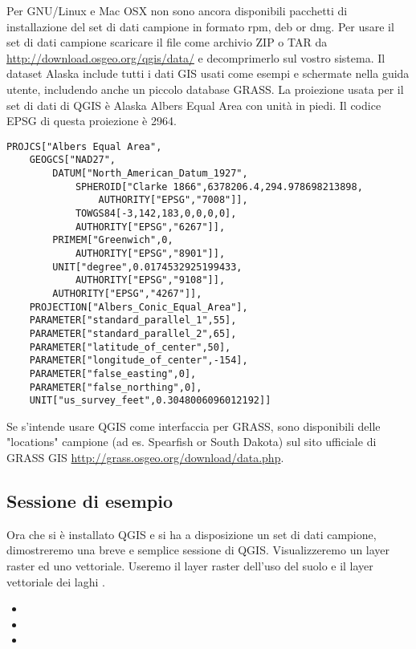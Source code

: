 \nix \osx Per GNU/Linux e Mac OSX non sono ancora disponibili pacchetti
di installazione del set di dati campione in formato rpm, deb or dmg.
Per usare il set di dati campione scaricare il file 
come archivio ZIP o TAR da \url{http://download.osgeo.org/qgis/data/}
e decomprimerlo sul vostro sistema. Il dataset Alaska include tutti
i dati GIS usati come esempi e schermate nella guida utente, includendo anche un piccolo database GRASS. La proiezione usata per
il set di dati di QGIS è Alaska Albers Equal Area con unità in piedi.
Il codice EPSG di questa proiezione è 2964.

\begin{verbatim}
PROJCS["Albers Equal Area",
    GEOGCS["NAD27",
        DATUM["North_American_Datum_1927",
            SPHEROID["Clarke 1866",6378206.4,294.978698213898,
                AUTHORITY["EPSG","7008"]],
            TOWGS84[-3,142,183,0,0,0,0],
            AUTHORITY["EPSG","6267"]],
        PRIMEM["Greenwich",0,
            AUTHORITY["EPSG","8901"]],
        UNIT["degree",0.0174532925199433,
            AUTHORITY["EPSG","9108"]],
        AUTHORITY["EPSG","4267"]],
    PROJECTION["Albers_Conic_Equal_Area"],
    PARAMETER["standard_parallel_1",55],
    PARAMETER["standard_parallel_2",65],
    PARAMETER["latitude_of_center",50],
    PARAMETER["longitude_of_center",-154],
    PARAMETER["false_easting",0],
    PARAMETER["false_northing",0],
    UNIT["us_survey_feet",0.3048006096012192]]
\end{verbatim}

Se s'intende usare QGIS come interfaccia per GRASS, sono disponibili delle "locations" campione
(ad es. Spearfish or South Dakota) sul sito ufficiale
di GRASS GIS \url{http://grass.osgeo.org/download/data.php}.

\subsection{Sessione di esempio}\label{samplesession}

Ora che si è installato QGIS e si ha a disposizione un set di dati
campione, dimostreremo una breve e semplice sessione di QGIS. Visualizzeremo
un layer raster ed uno vettoriale. Useremo il layer raster dell'uso
del suolo  e
il layer vettoriale dei laghi .


\begin{itemize}
\item {} 
\item {} 
\item {}
\end{itemize} 

